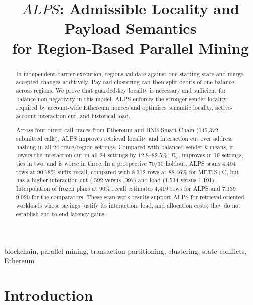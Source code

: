 \documentclass[conference,letterpaper]{IEEEtran}
\begin{document}
\title{$ALPS$: Admissible Locality and Payload Semantics\\
for Region-Based Parallel Mining}

\author{
}


\maketitle

\begin{abstract}
In independent-barrier execution, regions validate against one starting state
and merge accepted changes additively. Payload clustering can then split debits
of one balance across regions. We prove that guarded-key locality is necessary
and sufficient for balance non-negativity in this model. ALPS enforces the
stronger sender locality required by account-wide Ethereum nonces and optimises
semantic locality, active-account interaction cut, and historical load.

Across four direct-call traces from Ethereum and BNB Smart Chain (145,372
submitted calls), ALPS improves retrieval locality and interaction cut over
address hashing in all 24 trace/region settings. Compared with balanced sender
$k$-means, it lowers the interaction cut in all 24 settings by
$12.8$--$82.5\%$; $R_{90}$ improves in 19 settings, ties in two, and is worse in
three. In a prospective 70/30 holdout, ALPS scans 4,404 rows at 90.78\% suffix
recall, compared with 8,312 rows at 88.46\% for METIS$+$C, but has a higher
interaction cut (.592 versus .097) and load (1.534 versus 1.191). Interpolation
of frozen plans at 90\% recall estimates 4,419 rows for ALPS and
7,139--9,020 for the comparators. These scan-work results support ALPS for
retrieval-oriented workloads whose savings justify its interaction, load, and
allocation costs; they do not establish end-to-end latency gains.
\end{abstract}

\begin{IEEEkeywords}
blockchain, parallel mining, transaction partitioning, clustering, state
conflicts, Ethereum
\end{IEEEkeywords}

\section{Introduction}
\end{document}
